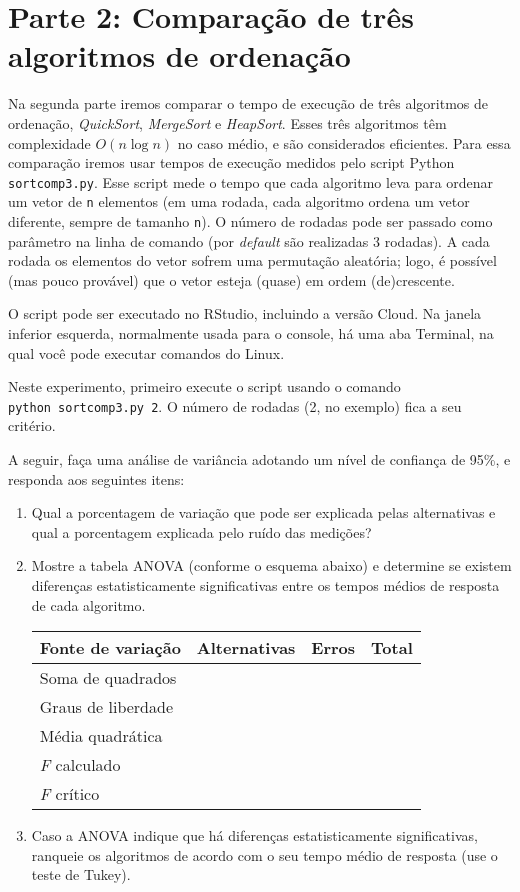 \documentclass[
]{article}
\begin{document}
\hypertarget{parte-2-comparauxe7uxe3o-de-truxeas-algoritmos-de-ordenauxe7uxe3o}{%
\section{Parte 2: Comparação de três algoritmos de
ordenação}\label{parte-2-comparauxe7uxe3o-de-truxeas-algoritmos-de-ordenauxe7uxe3o}}

Na segunda parte iremos comparar o tempo de execução de três algoritmos
de ordenação, \emph{QuickSort}, \emph{MergeSort} e \emph{HeapSort}.
Esses três algoritmos têm complexidade \(O(n \log n)\) no caso médio, e
são considerados eficientes. Para essa comparação iremos usar tempos de
execução medidos pelo script Python \texttt{sortcomp3.py}. Esse script
mede o tempo que cada algoritmo leva para ordenar um vetor de \texttt{n}
elementos (em uma rodada, cada algoritmo ordena um vetor diferente,
sempre de tamanho \texttt{n}). O número de rodadas pode ser passado como
parâmetro na linha de comando (por \emph{default} são realizadas 3
rodadas). A cada rodada os elementos do vetor sofrem uma permutação
aleatória; logo, é possível (mas pouco provável) que o vetor esteja
(quase) em ordem (de)crescente.

O script pode ser executado no RStudio, incluindo a versão Cloud. Na
janela inferior esquerda, normalmente usada para o console, há uma aba
Terminal, na qual você pode executar comandos do Linux.

Neste experimento, primeiro execute o script usando o comando
\texttt{python\ sortcomp3.py\ 2}. O número de rodadas (2, no exemplo)
fica a seu critério.

A seguir, faça uma análise de variância adotando um nível de confiança
de 95\%, e responda aos seguintes itens:

\begin{enumerate}
\def\labelenumi{\arabic{enumi}.}
\item
  Qual a porcentagem de variação que pode ser explicada pelas
  alternativas e qual a porcentagem explicada pelo ruído das medições?
\item
  Mostre a tabela ANOVA (conforme o esquema abaixo) e determine se
  existem diferenças estatisticamente significativas entre os tempos
  médios de resposta de cada algoritmo.

  \begin{longtable}[]{@{}llll@{}}
  \toprule\noalign{}
  Fonte de variação & Alternativas & Erros & Total \\
  \midrule\noalign{}
  \endhead
  \bottomrule\noalign{}
  \endlastfoot
  Soma de quadrados & & & \\
  Graus de liberdade & & & \\
  Média quadrática & & & \\
  \emph{F} calculado & & & \\
  \emph{F} crítico & & & \\
  \end{longtable}
\item
  Caso a ANOVA indique que há diferenças estatisticamente
  significativas, ranqueie os algoritmos de acordo com o seu tempo médio
  de resposta (use o teste de Tukey).
\end{enumerate}
\end{document}
